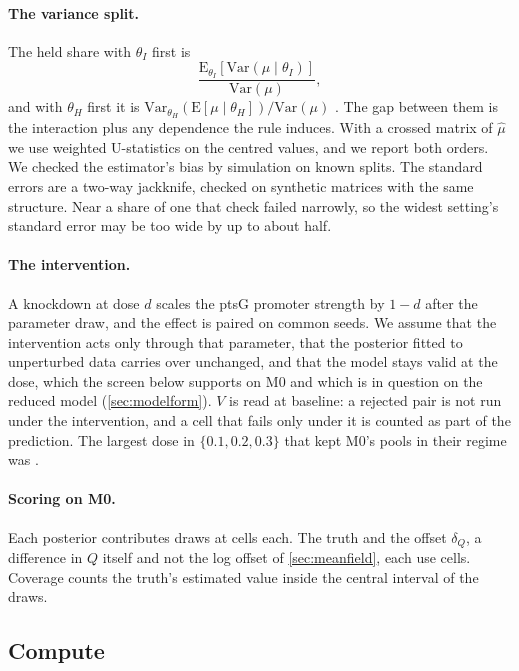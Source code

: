 \paragraph{The variance split.} The held share with $\theta_I$ first is \begin{equation} \frac{\mathrm{E}_{\theta_I}\!\left[\mathrm{Var}(\mu \mid \theta_I)\right]}{\mathrm{Var}(\mu)} , \end{equation} and with $\theta_H$ first it is $\mathrm{Var}_{\theta_H}(\mathrm{E}[\mu \mid \theta_H]) / \mathrm{Var}(\mu)$ \cite{saltelli2010variance}. The gap between them is the interaction plus any dependence the rule induces. With a crossed matrix of $\hat\mu$ we use weighted U-statistics on the centred values, and we report both orders. We checked the
estimator's bias by simulation on known splits. The standard errors are a two-way
jackknife, checked on synthetic matrices with the same structure. Near a share of one that
check failed narrowly, so the widest setting's standard error may be too wide by up to
about half.

\paragraph{The intervention.} A knockdown at dose $d$ scales the ptsG promoter strength
by $1 - d$ after the parameter draw, and the effect is paired on common seeds. We assume
that the intervention acts only through that parameter, that the posterior fitted to
unperturbed data carries over unchanged, and that the model stays valid at the dose, which the screen below supports on M0 and which is in question on the reduced model (\cref{sec:modelform}). $V$
is read at baseline: a rejected pair is not run under the intervention, and a cell that
fails only under it is counted as part of the prediction. The largest dose in
$\{0.1, 0.2, 0.3\}$ that kept M0's pools in their regime was .

\paragraph{Scoring on M0.} Each posterior contributes  draws at
 cells each. The truth and the offset $\delta_Q$, a difference in $Q$ itself and not the log offset of \cref{sec:meanfield}, each use 
cells. Coverage counts the truth's estimated value inside the central interval of the
draws.

\subsection{Compute}
\label{sec:compute}

